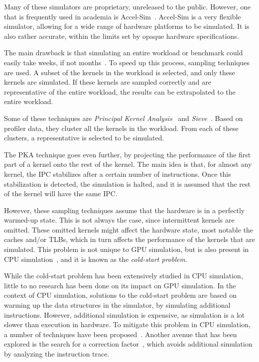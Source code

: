 \documentclass[5p,numvwe]{elsarticle}
\begin{document}
    Many of these simulators are proprietary, unreleased to the public.
    However, one that is frequently used in academia is Accel-Sim~\cite{accelsim}.
    Accel-Sim is a very flexible simulator, allowing for a wide range of hardware platforms to be simulated.
    It is also rather accurate, within the limits set by opaque hardware specifications.

    The main drawback is that simulating an entire workload or benchmark could easily take weeks, if not months~\cite{pks}.
    To speed up this process, sampling techniques are used.
    A subset of the kernels in the workload is selected, and only these kernels are simulated.
    If these kernels are sampled correctly and are representative of the entire workload, the results can be extrapolated to the entire workload.

    Some of these techniques are \textit{Principal Kernel Analysis}~\cite{pks} and \textit{Sieve}~\cite{sieve}.
    Based on profiler data, they cluster all the kernels in the workload.
    From each of these clusters, a representative is selected to be simulated.

    The PKA technique goes even further, by projecting the performance of the first part of a kernel onto the rest of the kernel.
    The main idea is that, for almost any kernel, the IPC stabilizes after a certain number of instructions.
    Once this stabilization is detected, the simulation is halted, and it is assumed that the rest of the kernel will have the same IPC\@.

    However, these sampling techniques assume that the hardware is in a perfectly warmed-up state.
    This is not always the case, since intermittent kernels are omitted.
    These omitted kernels might affect the hardware state, most notable the caches and/or TLBs, which in turn affects the performance of the kernels that are simulated.
    This problem is not unique to GPU simulation, but is also present in CPU simulation~\cite{blrl}, and it is known as the \textit{cold-start problem}.

    While the cold-start problem has been extensively studied in CPU simulation, little to no research has been done on its impact on GPU simulation.
    In the context of CPU simulation, solutions to the cold-start problem are based on warming up the data structures in the simulator, by simulating additional instructions.
    However, additional simulation is expensive, as simulation is a lot slower than execution in hardware.
    To mitigate this problem in CPU simulation, a number of techniques have been proposed~\cite{cpu-checkpoint,cpu-stitch-prime,cpu-merge-stitch-prime,cpu-nsl,cpu-mse,cpu-mrrl,blrl}.
    Another avenue that has been explored is the search for a correction factor~\cite{cpu-corr-fac}, which avoids additional simulation by analyzing the instruction trace.
\end{document}
